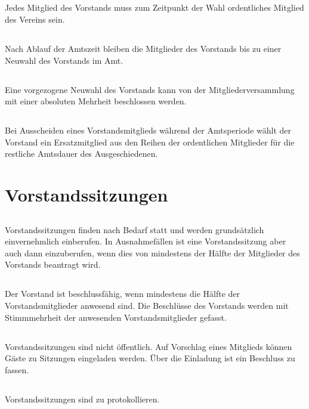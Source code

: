 \documentclass[12pt]{article}
\begin{document}
\subsection{}
Jedes Mitglied des Vorstands muss zum Zeitpunkt der Wahl ordentliches Mitglied des Vereins sein.
\subsection{}
Nach Ablauf der Amtszeit bleiben die Mitglieder des Vorstands bis zu einer Neuwahl des Vorstands im Amt.
\subsection{}
Eine vorgezogene Neuwahl des Vorstands kann von der Mitgliederversammlung mit einer absoluten Mehrheit beschlossen werden.
\subsection{}
Bei Ausscheiden eines Vorstandsmitglieds während der Amtsperiode wählt der Vorstand ein Ersatzmitglied aus den Reihen der ordentlichen Mitglieder für die restliche Amtsdauer des Ausgeschiedenen.

\section{Vorstandssitzungen}
\subsection{}
Vorstandssitzungen finden nach Bedarf statt und werden grundsätzlich einvernehmlich einberufen. In Ausnahmefällen ist eine Vorstandssitzung aber auch dann einzuberufen, wenn dies von mindestens der Hälfte der Mitglieder des Vorstands beantragt wird.
\subsection{}
Der Vorstand ist beschlussfähig, wenn mindestens die Hälfte der Vorstandsmitglieder anwesend sind. Die Beschlüsse des Vorstands werden mit Stimmmehrheit der anwesenden Vorstandsmitglieder gefasst.
\subsection{}
Vorstandssitzungen sind nicht öffentlich. Auf Vorschlag eines Mitglieds können Gäste zu Sitzungen eingeladen werden. Über die Einladung ist ein Beschluss zu fassen.
\subsection{}
Vorstandssitzungen sind zu protokollieren.
\end{document}

